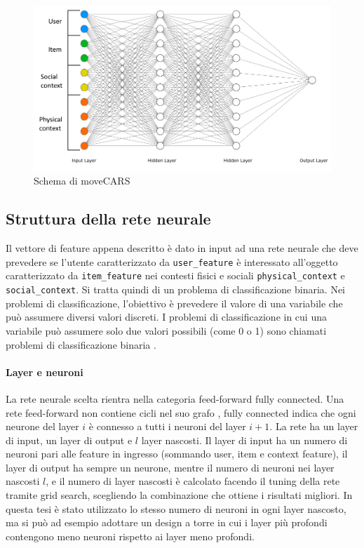 \documentclass[12pt,italian]{report}
\begin{document}
\begin{figure}
  \includegraphics[width=\linewidth]{immagini/ffnet_schema.png}
  \caption{Schema di moveCARS}
  \label{fig:ffnet}
\end{figure}

\subsection{Struttura della rete neurale}
Il vettore di feature appena descritto è dato in input ad una rete neurale che deve prevedere se l'utente caratterizzato da \texttt{user\_feature} è interessato all'oggetto caratterizzato da \texttt{item\_feature} nei contesti fisici e sociali \texttt{physical\_context} e \texttt{social\_context}. Si tratta quindi di un problema di classificazione binaria. Nei problemi di classificazione, l'obiettivo è prevedere il valore di una variabile che può assumere diversi valori discreti. I problemi di classificazione in cui una variabile può assumere solo due valori possibili (come 0 o 1) sono chiamati problemi di classificazione binaria \cite{hands-on-ml}.

\paragraph{Layer e neuroni}
La rete neurale scelta rientra nella categoria feed-forward fully connected. Una rete feed-forward non contiene cicli nel suo grafo \cite{Goodfellow-et-al-2016}, fully connected indica che ogni neurone del layer $i$ è connesso a tutti i neuroni del layer $i+1$. La rete ha un layer di input, un layer di output e $l$ layer nascosti. Il layer di input ha un numero di neuroni pari alle feature in ingresso (sommando user, item e context feature), il layer di output ha sempre un neurone, mentre il numero di neuroni nei layer nascosti $l$, e il numero di layer nascosti è calcolato facendo il tuning della rete tramite grid search, scegliendo la combinazione che ottiene i risultati migliori. In questa tesi è stato utilizzato lo stesso numero di neuroni in ogni layer nascosto, ma si può ad esempio adottare un design a torre in cui i layer più profondi contengono meno neuroni rispetto ai layer meno profondi.
\end{document}

